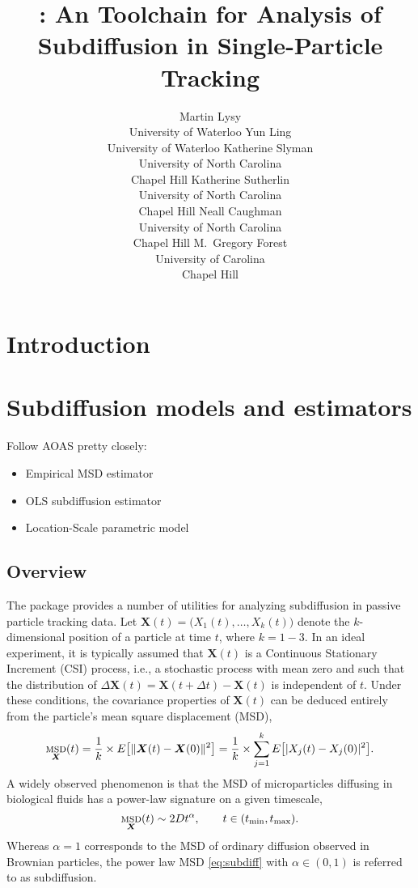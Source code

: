 \documentclass[article]{jss}
\author{
  Martin Lysy\\University of Waterloo
  \And
  Yun Ling\\University of Waterloo
  \AND
  Katherine Slyman\\University of North Carolina\\Chapel Hill
  \And
  Katherine Sutherlin\\University of North Carolina\\Chapel Hill
  \AND
  Neall Caughman\\University of North Carolina\\Chapel Hill
  \And
  M.~Gregory Forest\\University of Carolina\\Chapel Hill
}
\title{\pkg{subdiff}: An \proglang{R} Toolchain for Analysis of Subdiffusion in Single-Particle Tracking}
\newcommand{\nd}{k}
\newcommand{\XX}{\bm{X}}
\newcommand{\dXX}{\Delta\XX}
\newcommand{\dt}{\Delta t}
\newcommand{\tmin}{t_{\textnormal{min}}}
\newcommand{\tmax}{t_{\textnormal{max}}}
\DeclareMathOperator{\msd}{\textsc{msd}}
\begin{document}

\section{Introduction} \label{sec:intro}


\section{Subdiffusion models and estimators}

Follow AOAS pretty closely:
\begin{itemize}
\item Empirical MSD estimator
\item OLS subdiffusion estimator
\item Location-Scale parametric model
\end{itemize}

\subsection{Overview}

The  package provides a number of utilities for analyzing subdiffusion in passive particle tracking data.  Let $\XX(t) = \big(X_1(t), \ldots, X_k(t)\big)$ denote the $k$-dimensional position of a particle at time $t$, where $k = 1-3$.  In an ideal experiment, it is typically assumed that $\XX(t)$ is a Continuous Stationary Increment (CSI) process, i.e., a stochastic process with mean zero and such that the distribution of $\dXX(t) = \XX(t+\dt) - \XX(t)$ is independent of $t$.  Under these conditions, the covariance properties of $\XX(t)$ can be deduced entirely from the particle's mean square displacement (MSD),
\begin{equation}\label{eq:msd}
  \msd_{\XX}(t) = \frac 1 \nd \times E\bigl[\lVert \XX(t) - \XX(0) \rVert^2\bigr] = \frac 1 \nd \times \sum_{j=1}^\nd E\bigl[\lvert X_j(t) - X_j(0) \rvert^2\bigr].
\end{equation}
A widely observed phenomenon is that the MSD of microparticles diffusing in biological fluids has a power-law signature on a given timescale,
\begin{equation}
  \msd_{\XX}(t) \sim 2D t^\alpha, \qquad t \in (\tmin, \tmax).
  \label{eq:subdiff}
\end{equation}
Whereas $\alpha = 1$ corresponds to the MSD of ordinary diffusion observed in Brownian particles, the power law MSD \eqref{eq:subdiff} with $\alpha \in (0,1)$ is referred to as subdiffusion.  
\end{document}
